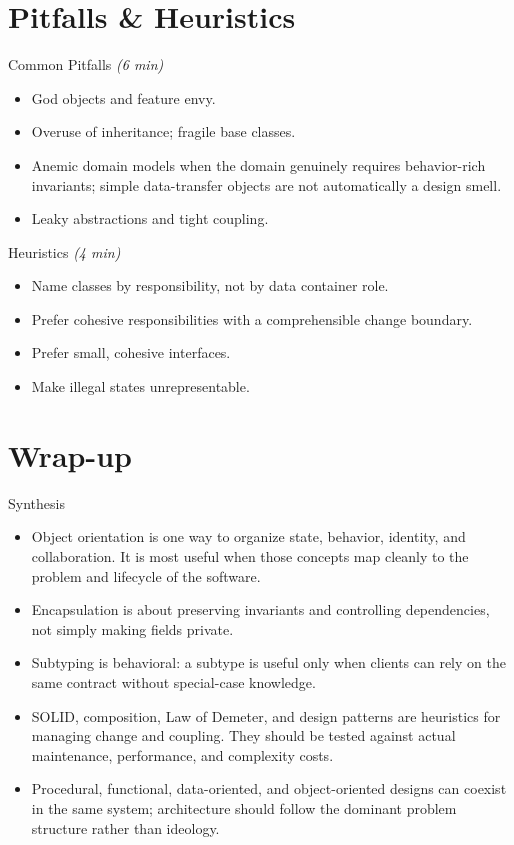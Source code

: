 \documentclass[aspectratio=169,11pt]{beamer}
\newcommand{\mins}[1]{\textit{(#1 min)}}
\begin{document}
\section{Pitfalls \& Heuristics}

\begin{frame}{Common Pitfalls \mins{6}}
  \begin{itemize}
    \item God objects and feature envy.
    \item Overuse of inheritance; fragile base classes.
    \item Anemic domain models when the domain genuinely requires behavior-rich invariants; simple data-transfer objects are not automatically a design smell.
    \item Leaky abstractions and tight coupling.
  \end{itemize}
\end{frame}

\begin{frame}{Heuristics \mins{4}}
  \begin{itemize}
    \item Name classes by responsibility, not by data container role.
    \item Prefer cohesive responsibilities with a comprehensible change boundary.
    \item Prefer small, cohesive interfaces.
    \item Make illegal states unrepresentable.
  \end{itemize}
\end{frame}

\section{Wrap-up}

\begin{frame}{Synthesis}
  \begin{itemize}
    \item Object orientation is one way to organize state, behavior, identity, and collaboration. It is most useful when those concepts map cleanly to the problem and lifecycle of the software.
    \item Encapsulation is about preserving invariants and controlling dependencies, not simply making fields private.
    \item Subtyping is behavioral: a subtype is useful only when clients can rely on the same contract without special-case knowledge.
    \item SOLID, composition, Law of Demeter, and design patterns are heuristics for managing change and coupling. They should be tested against actual maintenance, performance, and complexity costs.
    \item Procedural, functional, data-oriented, and object-oriented designs can coexist in the same system; architecture should follow the dominant problem structure rather than ideology.
  \end{itemize}
\end{frame}
\end{document}
